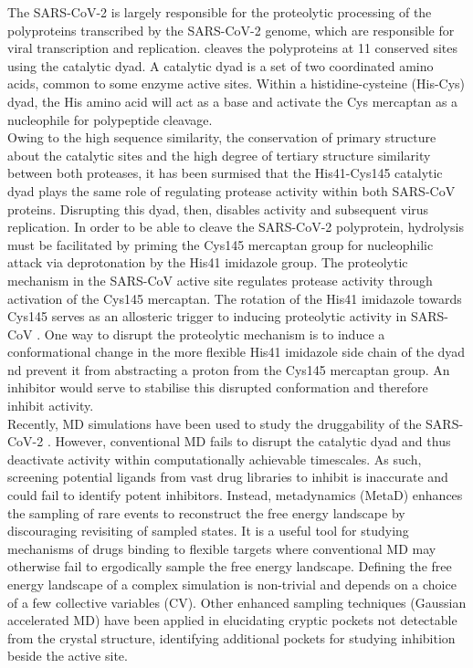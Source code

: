 The SARS-CoV-2 \mpro is largely responsible for the proteolytic processing of the polyproteins transcribed by the SARS-CoV-2 genome, which are responsible for viral transcription and replication. \mpro cleaves the polyproteins at 11 conserved sites using the catalytic dyad.\cite{hegyi2002conservation, jin2020structure} A catalytic dyad is a set of two coordinated amino acids, common to some enzyme active sites. Within a histidine-cysteine (His-Cys) dyad, the His amino acid will act as a base and activate the Cys mercaptan as a nucleophile for polypeptide cleavage. \\

Owing to the high sequence similarity, the conservation of primary structure about the catalytic sites and the high degree of tertiary structure similarity between both proteases, it has been surmised that the His41-Cys145 catalytic dyad plays the same role of regulating protease activity within both SARS-CoV \mpro proteins.\cite{jin2020structure, ullrich2020sars} Disrupting this dyad, then, disables \mpro activity and subsequent virus replication. In order to be able to cleave the SARS-CoV-2 polyprotein, hydrolysis must be facilitated by priming the \mpro Cys145 mercaptan group for nucleophilic attack via deprotonation by the His41 imidazole group. The proteolytic mechanism in the SARS-CoV \mpro active site regulates protease activity through activation of the Cys145 mercaptan. The rotation of the His41 imidazole towards Cys145 serves as an allosteric trigger to inducing proteolytic activity in SARS-CoV \mpro. One way to disrupt the proteolytic mechanism is to induce a conformational change in the more flexible His41 imidazole side chain of the dyad nd prevent it from abstracting a proton from the Cys145 mercaptan group. An inhibitor would serve to stabilise this disrupted conformation and therefore inhibit \mpro activity.\\

Recently, MD simulations have been used to study the druggability of the SARS-CoV-2 \mpro\!\!.\cite{macchiagodena2020identification, ghahremanpour2020identification} However, conventional MD fails to disrupt the \mpro catalytic dyad and thus deactivate \mpro activity within computationally achievable timescales. As such, screening potential ligands from vast drug libraries to inhibit \mpro is inaccurate and could fail to identify potent inhibitors. Instead, metadynamics (MetaD) enhances the sampling of rare events to reconstruct the free energy landscape by discouraging revisiting of sampled states. It is a useful tool for studying mechanisms of drugs binding to flexible targets where conventional MD may otherwise fail to ergodically sample the free energy landscape. Defining the free energy landscape of a complex simulation is non-trivial and depends on a choice of a few collective variables (CV).\cite{laio2008metadynamics} Other enhanced sampling techniques (Gaussian accelerated MD\cite{gamd}) have been applied in elucidating cryptic pockets not detectable from the \mpro crystal structure, identifying additional pockets for studying \mpro inhibition beside the active site.\cite{sztain2020elucidation}\\


